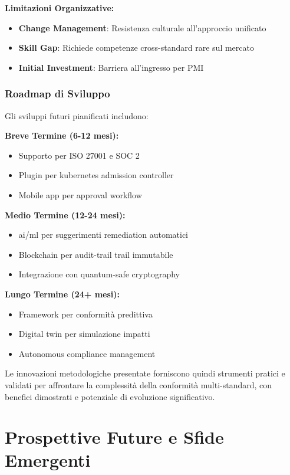 \textbf{Limitazioni Organizzative:}
\begin{itemize}
    \item \textbf{Change Management}: Resistenza culturale all'approccio unificato
    \item \textbf{Skill Gap}: Richiede competenze cross-standard rare sul mercato
    \item \textbf{Initial Investment}: Barriera all'ingresso per PMI
\end{itemize}

\subsubsection{Roadmap di Sviluppo}

Gli sviluppi futuri pianificati includono:

\textbf{Breve Termine (6-12 mesi):}
\begin{itemize}
    \item Supporto per ISO 27001 e SOC 2
    \item Plugin per \gls{kubernetes} admission controller
    \item Mobile app per approval workflow
\end{itemize}

\textbf{Medio Termine (12-24 mesi):}
\begin{itemize}
    \item \gls{ai}/\gls{ml} per suggerimenti remediation automatici
    \item Blockchain per \gls{audit-trail} trail immutabile
    \item Integrazione con quantum-safe cryptography
\end{itemize}

\textbf{Lungo Termine (24+ mesi):}
\begin{itemize}
    \item Framework per conformità predittiva
    \item Digital twin per simulazione impatti
    \item Autonomous \gls{compliance} management
\end{itemize}

Le innovazioni metodologiche presentate forniscono quindi strumenti pratici e validati per affrontare la complessità della conformità multi-standard, con benefici dimostrati e potenziale di evoluzione significativo.

\section{\texorpdfstring{\textbf{Prospettive Future e Sfide Emergenti}}{4.8 - Prospettive Future e Sfide Emergenti}}

